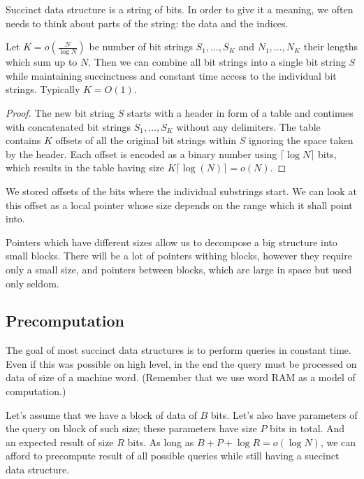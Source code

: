 Succinct data structure is a string of bits.
In order to give it a meaning, we often needs to think about parts of the string: the data and the indices.

\begin{lemma}
	Let $K = o(\frac{N}{\log N})$ be number of bit strings $S_1, \ldots, S_K$ and $N_1, \dots, N_K$ their lengths which sum up to $N$.
	Then we can combine all bit strings into a single bit string $S$ while maintaining succinctness and constant time access to the individual bit strings.
	Typically $K = O(1)$.
\end{lemma}
\begin{proof}
	The new bit string $S$ starts with a header in form of a table and continues with concatenated bit strings $S_1, \ldots, S_K$ without any delimiters.
	The table contains $K$ offsets of all the original bit strings within $S$ ignoring the space taken by the header.
	Each offset is encoded as a binary number using $\lceil \log N \rceil$ bits, which results in the table having size $K \lceil \log (N) \rceil = o(N)$.
\end{proof}

We stored offsets of the bits where the individual substrings start.
We can look at this offset as a local pointer whose size depends on the range which it shall point into.

Pointers which have different sizes allow us to decompose a big structure into small blocks.
There will be a lot of pointers withing blocks, however they require only a small size, and pointers between blocks, which are large in space but used only seldom.

\subsection{Precomputation}

The goal of most succinct data structures is to perform queries in constant time.
Even if this was possible on high level, in the end the query must be processed on data of size of a machine word.
(Remember that we use word RAM as a model of computation.)

Let's assume that we have a block of data of $B$ bits.
Let's also have parameters of the query on block of such size; these parameters have size $P$ bits in total.
And an expected result of size $R$ bits.
As long as $B+P+\log R = o(\log N)$, we can afford to precompute result of all possible queries while still having a succinct data structure.


